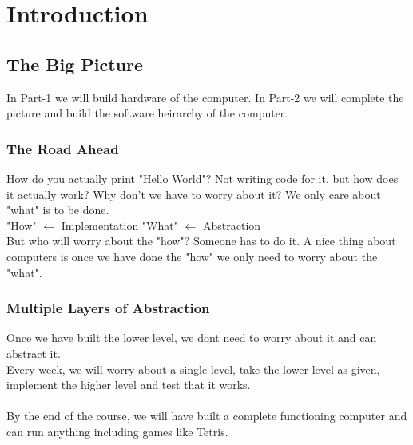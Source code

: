 \chapter{Introduction}

\section{The Big Picture}

In Part-1 we will build hardware of the computer. In Part-2 we will complete 
the picture and build the software heirarchy of the computer.

\subsection{The Road Ahead}
How do you actually print "Hello World"? Not writing code for it, but how does
it actually work? Why don't we have to worry about it?
We only care about "what" is to be done. \\

"How" $\leftarrow$ Implementation \quad
"What" $\leftarrow$ Abstraction \\

But who will worry about the "how"? Someone has to do it. A nice thing about
computers is once we have done the "how" we only need to
worry about the "what". \\

\subsection{Multiple Layers of Abstraction}
Once we have built the lower level, we dont need to
worry about it and can abstract it. \\

Every week, we will worry about a single level, take the lower level as given,
implement the higher level and test that it works. \\\\

By the end of the course, we will have built a complete functioning computer
and can run anything including games like Tetris.

